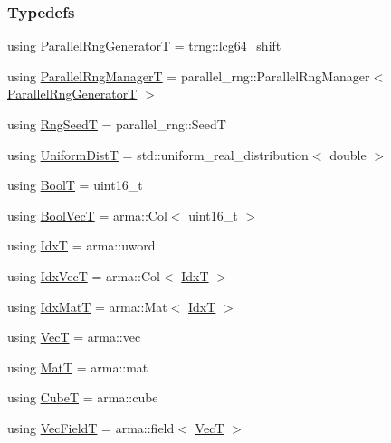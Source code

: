 \subsubsection*{Typedefs}
\begin{DoxyCompactItemize}
\item 
using \hyperlink{namespacemappel_ad1e99b214465229065d30f881a89d1cc}{Parallel\+Rng\+GeneratorT} = trng\+::lcg64\+\_\+shift
\item 
using \hyperlink{namespacemappel_acf276a4212f07b1ed4cb2ddce379ba1d}{Parallel\+Rng\+ManagerT} = parallel\+\_\+rng\+::\+Parallel\+Rng\+Manager$<$ \hyperlink{namespacemappel_ad1e99b214465229065d30f881a89d1cc}{Parallel\+Rng\+GeneratorT} $>$
\item 
using \hyperlink{namespacemappel_a318bca259a7add5979160939a3f4e60b}{Rng\+SeedT} = parallel\+\_\+rng\+::\+SeedT
\item 
using \hyperlink{namespacemappel_ac559959896fbdf3a8ce294353ea41aff}{Uniform\+DistT} = std\+::uniform\+\_\+real\+\_\+distribution$<$ double $>$
\item 
using \hyperlink{namespacemappel_a74f3ebfb073cdde8b57926847deb4daa}{BoolT} = uint16\+\_\+t
\item 
using \hyperlink{namespacemappel_a167d761ecce3cafb6f98c00c16bdb523}{Bool\+VecT} = arma\+::\+Col$<$ uint16\+\_\+t $>$
\item 
using \hyperlink{namespacemappel_ab17ec0f30b61ece292439d7ece81d3a8}{IdxT} = arma\+::uword
\item 
using \hyperlink{namespacemappel_ac63743dcd42180127307cd0e4ecdd784}{Idx\+VecT} = arma\+::\+Col$<$ \hyperlink{namespacemappel_ab17ec0f30b61ece292439d7ece81d3a8}{IdxT} $>$
\item 
using \hyperlink{namespacemappel_a08989eafa9aeb1a4c3ec773614297d0d}{Idx\+MatT} = arma\+::\+Mat$<$ \hyperlink{namespacemappel_ab17ec0f30b61ece292439d7ece81d3a8}{IdxT} $>$
\item 
using \hyperlink{namespacemappel_a2225ad69f358daa3f4f99282a35b9a3a}{VecT} = arma\+::vec
\item 
using \hyperlink{namespacemappel_a7091ab87c528041f7e2027195fad8915}{MatT} = arma\+::mat
\item 
using \hyperlink{namespacemappel_ab2afab4e6c8805e83946670d882768c2}{CubeT} = arma\+::cube
\item 
using \hyperlink{namespacemappel_a834ec4f32487f07c0ca1e22d4928d1f8}{Vec\+FieldT} = arma\+::field$<$ \hyperlink{namespacemappel_a2225ad69f358daa3f4f99282a35b9a3a}{VecT} $>$
\item 

\end{DoxyCompactItemize}
